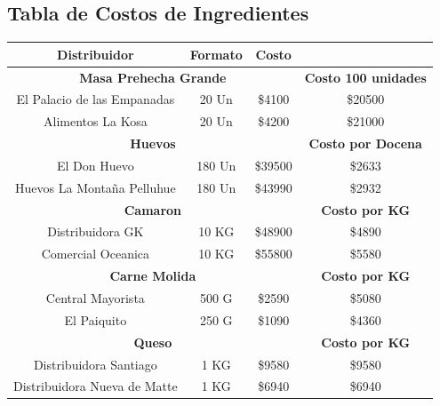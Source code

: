 \documentclass[12pt]{article}
\begin{document}
\subsection{Tabla de Costos de Ingredientes}

    \begin{longtable}{|| c | c | c | c||}
        \hline
        \textbf{Distribuidor} & Formato & \textbf{Costo} &  \\ [0.5ex]
        \hline\hline
        \multicolumn{3}{||c|}{\textbf{Masa Prehecha Grande}} & \textbf{Costo 100 unidades} \\ [0.5ex] \hline \hline
        El Palacio de las Empanadas & 20 Un & \$4100 & \$20500 \\ \hline
        Alimentos La Kosa & 20 Un & \$4200 & \$21000 \\ [1ex] \hline \hline

        \multicolumn{3}{||c|}{\textbf{Huevos}} & \textbf{Costo por Docena} \\ [0.5ex] \hline \hline
        El Don Huevo & 180 Un & \$39500 & \$2633 \\ \hline
        Huevos La Montaña Pelluhue & 180 Un & \$43990 & \$2932 \\ [1ex] \hline

        \multicolumn{3}{||c|}{\textbf{Camaron}} & \textbf{Costo por KG} \\ [0.5ex] \hline \hline
        Distribuidora GK & 10 KG & \$48900 & \$4890 \\ \hline
        Comercial Oceanica & 10 KG & \$55800 & \$5580 \\ [1ex] \hline

        \multicolumn{3}{||c|}{\textbf{Carne Molida}} & \textbf{Costo por KG} \\ [0.5ex] \hline \hline %
        Central Mayorista & 500 G & \$2590 & \$5080 \\ \hline 
        El Paiquito & 250 G & \$1090 & \$4360 \\ [1ex] \hline \hline


        \multicolumn{3}{||c|}{\textbf{Queso}} & \textbf{Costo por KG} \\ [0.5ex] \hline \hline %
        Distribuidora Santiago & 1 KG & \$9580 & \$9580 \\ \hline
        Distribuidora Nueva de Matte & 1 KG & \$6940 & \$6940 \\ [1ex] \hline


\end{longtable}
\end{document}

